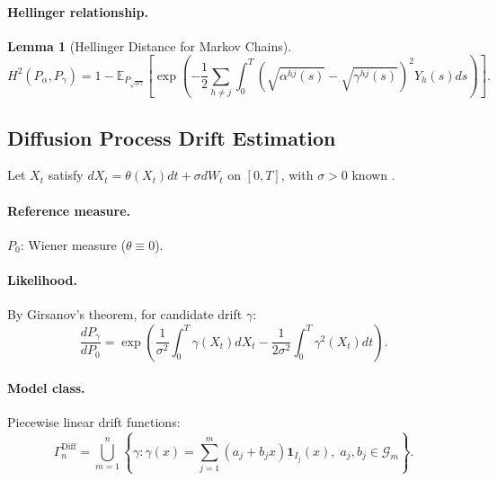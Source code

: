 \documentclass[preprint,review,12pt]{article}
\newtheorem{lemma}[theorem]{Lemma}
\begin{document}
\paragraph{Hellinger relationship.}

\begin{lemma}[Hellinger Distance for Markov Chains]\label{lem:markov_hellinger}
\begin{equation}\label{eq:markov_hellinger}
	H^2(P_\alpha, P_\gamma) = 1 - \mathbb{E}_{P_{\sqrt{\alpha\gamma}}}\left[ 
	\exp\left( -\frac{1}{2} \sum_{h \neq j} \int_0^T 
	(\sqrt{\alpha^{hj}(s)} - \sqrt{\gamma^{hj}(s)})^2 Y_h(s) ds \right) \right].
\end{equation}
\end{lemma}

\subsection{Diffusion Process Drift Estimation}
\label{subsec:diffusion}

Let $X_t$ satisfy $dX_t = \theta(X_t) dt + \sigma dW_t$ on $[0, T]$, with 
$\sigma > 0$ known \citep{Kutoyants2004}.

\paragraph{Reference measure.} $P_0$: Wiener measure ($\theta \equiv 0$).

\paragraph{Likelihood.} By Girsanov's theorem, for candidate drift $\gamma$:
\begin{equation}\label{eq:diffusion_likelihood}
\frac{dP_\gamma}{dP_0} = \exp\left( \frac{1}{\sigma^2} \int_0^T 
\gamma(X_t) dX_t - \frac{1}{2\sigma^2} \int_0^T \gamma^2(X_t) dt \right).
\end{equation}

\paragraph{Model class.} Piecewise linear drift functions:
\begin{equation}\label{eq:diffusion_class}
\Gamma_n^{\text{Diff}} = \bigcup_{m=1}^{n} \left\{ \gamma : 
\gamma(x) = \sum_{j=1}^{m} (a_j + b_j x) \mathbf{1}_{I_j}(x), \; 
a_j, b_j \in \mathcal{G}_m \right\}.
\end{equation}
\end{document}
